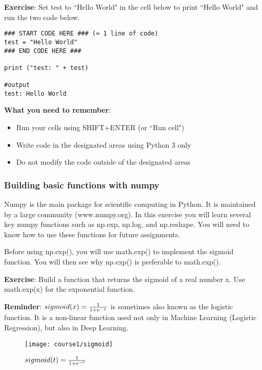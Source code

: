{\textbf {Exercise}}: Set test to ``Hello World" in the cell below to print ``Hello World" and run the two code below.
\begin{verbatim}
### START CODE HERE ### (≈ 1 line of code)
test = "Hello World"
### END CODE HERE ###

print ("test: " + test)

#output
test: Hello World
\end{verbatim}

{\textbf {What you need to remember}}:
\begin{itemize}
\item Run your cells using SHIFT+ENTER (or ``Run cell")
\item Write code in the designated areas using Python 3 only
\item Do not modify the code outside of the designated areas
\end{itemize}

\subsubsection{Building basic functions with numpy}

Numpy is the main package for scientific computing in Python. It is maintained by a large community (www.numpy.org). In this exercise you will learn several key numpy functions such as np.exp, np.log, and np.reshape. You will need to know how to use these functions for future assignments.



Before using np.exp(), you will use math.exp() to implement the sigmoid function. You will then see why np.exp() is preferable to math.exp().

{\textbf {Exercise}}: Build a function that returns the sigmoid of a real number x. Use math.exp(x) for the exponential function.


{\textbf {Reminder}}: $sigmoid(x) = \frac{{\rm{1}}}{{{\rm{1 + }}{e^{ - x}}}}$ is sometimes also known as the logistic function. It is a non-linear function used not only in Machine Learning (Logistic Regression), but also in Deep Learning.
\begin{figure}[h]
\begin{center}
\texttt{[image: course1/sigmoid]}
\end{center}
\caption{$sigmoid(t) = \frac{{\rm{1}}}{{{\rm{1 + }}{e^{ - t}}}}$}
\end{figure}

